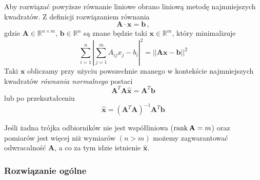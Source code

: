 Aby rozwiązać powyższe równanie liniowe obrano liniową metodę najmniejszych kwadratów. Z definicji rozwiązaniem równania
\begin{equation}
    \mathbf{A} \cdot \mathbf{x} = \mathbf{b}\,,
\end{equation}
gdzie $\mathbf{A} \in \mathbb{R}^{n\times m}$, $\mathbf{b} \in \mathbb{R}^n$ są znane będzie taki $\mathbf{x} \in \mathbb{R}^m$, który minimalizuje
\begin{equation}
    \sum_{i=1}^{n}{\left|\sum_{j=1}^{m}{A_{ij}x_j} - b_i\right|^2} = ||\mathbf{A}\mathbf{x} - \mathbf{b}||^2
\end{equation}
Taki $\mathbf{x}$ obliczamy przy użyciu powszechnie znanego w kontekście najmniejszych kwadratów \textit{równania normalnego} postaci
\begin{equation}
    \mathbf{A}^T\mathbf{A}\hat{\mathbf{x}} = \mathbf{A}^T\mathbf{b}
\end{equation}
lub po przekształceniu
\begin{equation}\label{eq:lls}
    \hat{\mathbf{x}} = {\left(\mathbf{A}^T\mathbf{A}\right)}^{-1}\mathbf{A}^T\mathbf{b}
\end{equation}

Jeśli żadna trójka odbiorników nie jest współliniowa ($\operatorname{rank}\mathbf{A} = m$) oraz pomiarów jest więcej niż wymiarów $(n > m)$ możemy zagwarantować odwracalność $\mathbf{A}$, a co za tym idzie istnienie $\hat{\mathbf{x}}$.

\subsubsection{Rozwiązanie ogólne}

